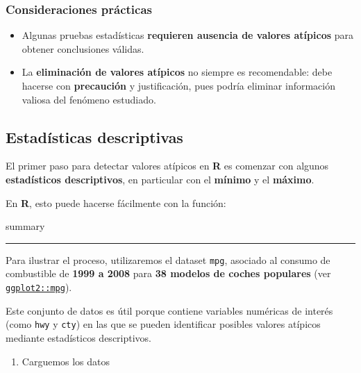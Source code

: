 \documentclass[
]{book}
\newenvironment{Shaded}{\begin{snugshade}}{\end{snugshade}}
\newcommand{\NormalTok}[1]{#1}
\providecommand{\tightlist}{%
  \setlength{\itemsep}{0pt}\setlength{\parskip}{0pt}}
\begin{document}
\subsubsection{Consideraciones prácticas}\label{consideraciones-pruxe1cticas}

\begin{itemize}
\tightlist
\item
  Algunas pruebas estadísticas \textbf{requieren ausencia de valores atípicos} para obtener conclusiones válidas.\\
\item
  La \textbf{eliminación de valores atípicos} no siempre es recomendable: debe hacerse con \textbf{precaución} y justificación, pues podría eliminar información valiosa del fenómeno estudiado.
\end{itemize}

\subsection{Estadísticas descriptivas}\label{estaduxedsticas-descriptivas}

El primer paso para detectar valores atípicos en \textbf{R} es comenzar con algunos \textbf{estadísticos descriptivos}, en particular con el \textbf{mínimo} y el \textbf{máximo}.

En \textbf{R}, esto puede hacerse fácilmente con la función:

\begin{Shaded}
\begin{Highlighting}[]
\NormalTok{summary}
\end{Highlighting}
\end{Shaded}

\begin{center}\rule{0.5\linewidth}{0.5pt}\end{center}

Para ilustrar el proceso, utilizaremos el dataset \texttt{mpg}, asociado al consumo de combustible de \textbf{1999 a 2008} para \textbf{38 modelos de coches populares} (ver \href{https://ggplot2.tidyverse.org/reference/mpg.html}{\texttt{ggplot2::mpg}}).

Este conjunto de datos es útil porque contiene variables numéricas de interés (como \texttt{hwy} y \texttt{cty}) en las que se pueden identificar posibles valores atípicos mediante estadísticos descriptivos.

\begin{enumerate}
\def\labelenumi{\arabic{enumi}.}
\tightlist
\item
  Carguemos los datos
\end{enumerate}
\end{document}
